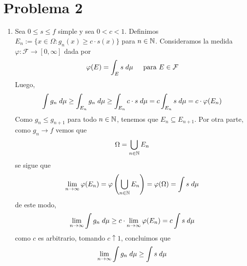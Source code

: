 \documentclass{article}
\begin{document}
\section*{Problema 2}
\begin{enumerate}
    \item Sea $0\leq s\leq f$ simple y sea $0<c<1$. Definimos $E_{n}:=\{x\in\Omega:g_{n}(x)\geq c\cdot 
    s(x)\}$ para $n\in\mathbb{N}$. Consideramos la medida $\varphi:\mathcal{F}\to[0,\infty]$ dada por
    \begin{equation*}
        \varphi(E)=\int_{E}s\hspace{1mm}d\mu\hspace{4mm}\text{ para }E\in\mathcal{F}
    \end{equation*}
    Luego,
    \begin{equation*}
        \int g_{n}\hspace{1mm}d\mu\geq\int_{E_{n}} g_{n}\hspace{1mm}d\mu
        \geq\int_{E_{n}} c\cdot s\hspace{1mm}d\mu=c\int_{E_{n}} s\hspace{1mm}d\mu
        =c\cdot\varphi(E_{n})
    \end{equation*}
    Como $g_{n}\leq g_{n+1}$ para todo $n\in\mathbb{N}$, tenemos que $E_{n}\subseteq E_{n+1}$. Por otra 
    parte, como $g_{n}\to f$ vemos que
    \begin{equation*}
        \Omega=\bigcup_{n\in\mathbb{N}}E_{n}
    \end{equation*}
    se sigue que
    \begin{equation*}
        \lim\limits_{n\to\infty}\varphi(E_{n})=\varphi\left(\bigcup_{n\in\mathbb{N}}E_{n}\right)
        =\varphi(\Omega)=\int s\hspace{1mm}d\mu
    \end{equation*}
    de este modo,
    \begin{equation*}
        \lim\limits_{n\to\infty}\int g_{n}\hspace{1mm}d\mu\geq c\cdot\lim\limits_{n\to\infty}
        \varphi(E_{n})=c\int s\hspace{1mm}d\mu
    \end{equation*}
    como $c$ es arbitrario, tomando $c\uparrow1$, concluimos que
    \begin{equation*}
        \lim\limits_{n\to\infty}\int g_{n}\hspace{1mm}d\mu\geq\int s\hspace{1mm}d\mu
    \end{equation*}


\end{enumerate}
\end{document}
